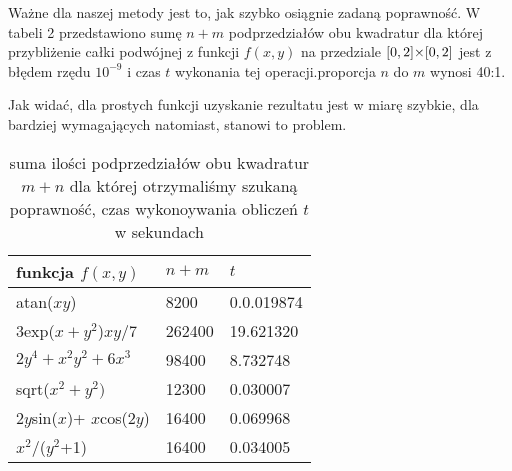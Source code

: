\documentclass[a4paper,12pt]{article}
\newcommand{\razy}{\hspace{-0.5ex}\times\hspace{-0.5ex}} %
\begin{document}
\par Ważne dla naszej metody jest to, jak szybko osiągnie zadaną poprawność. W tabeli 2 przedstawiono sumę  $n+m$ podprzedziałów obu kwadratur  dla której przybliżenie całki podwójnej z funkcji $f(x,y)$ na przedziale $[0,2]\razy[0,2]$ jest z błędem rzędu $10^{-9}$ i czas $t$ wykonania tej operacji.proporcja $n$ do $m$ wynosi 40:1.
\par Jak widać, dla prostych funkcji uzyskanie rezultatu jest w miarę szybkie, dla bardziej wymagających   natomiast, stanowi to problem.
\par 
\par 
\begin{table}[H]
    \centering
    \begin{tabular}{|C{ 30ex}|C{20ex}|C{20ex}|}
    \hline
    funkcja $f(x,y)$ & $n + m$ & $t$\\
         \hline
          atan($xy$) & 8200  &0.0.019874\\
         \hline
        
        3exp($x+y^2$)$xy$/7 & 262400 &19.621320\\
         \hline
        $2y^4+x^2y^2+6x^3$& 98400  &8.732748\\
         \hline
        sqrt($x^2+y^2)$ & 12300  &0.030007\\
         $y$sin($x$)+ $x$cos($2y$)& 16400  &0.069968\\
         \hline
         $x^2$/($y^2$+1) & 16400  &0.034005\\
         \hline
         
    \end{tabular}
    \caption{\footnotesize suma ilości podprzedziałów obu kwadratur $m+n$ dla której otrzymaliśmy szukaną poprawność, czas wykonoywania obliczeń $t$ w sekundach }
    \label{tab:my_label}
\end{table}
\end{document}
